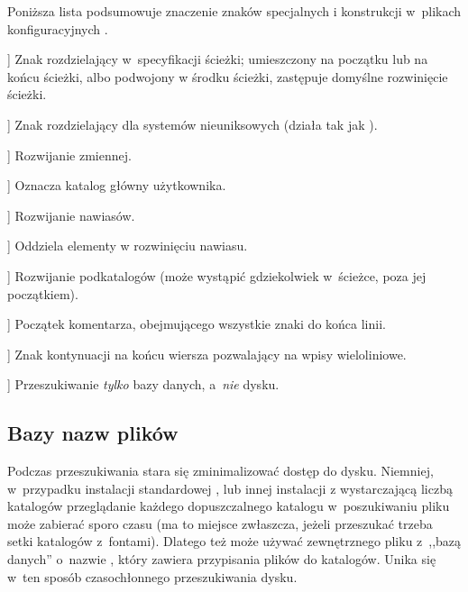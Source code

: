 \documentclass{article}
\begin{document}
Poniższa lista podsumowuje znaczenie znaków specjalnych i konstrukcji w~plikach
konfiguracyjnych \KPS{}.

\newcommand{\CODE}[1]{\makebox[3em][l]{\code{#1}}}
\begin{ttdescription}
\item[\CODE{:}] Znak rozdzielający w~specyfikacji ścieżki; umieszczony na
 początku lub na końcu ścieżki, albo podwojony w środku ścieżki, zastępuje domyślne rozwinięcie ścieżki.\par
\item[\CODE{;}] Znak rozdzielający dla systemów nieuniksowych
 (działa tak jak \code{:}).
\item[\CODE{\$}] Rozwijanie zmiennej.
\item[\CODE{\string~}] Oznacza katalog główny użytkownika.
\item[\CODE{\char`\{\dots\char`\}}] Rozwijanie nawiasów.%
\item[\CODE{,}] Oddziela elementy w rozwinięciu nawiasu.%
\item[\CODE{//}] Rozwijanie podkatalogów (może wystąpić gdziekolwiek
 w~ścieżce, poza jej początkiem).
\item[\CODE{\%}] Początek komentarza, obejmującego wszystkie znaki do końca
 linii.
\item[\CODE{\bs}] Znak kontynuacji na końcu wiersza pozwalający na wpisy wieloliniowe.%
\item[\CODE{!!}] Przeszukiwanie \emph{tylko} bazy danych,
         a~\emph{nie} dysku.
\end{ttdescription}

\subsection{Bazy nazw plików}
\label{sec:filename-database}

Podczas przeszukiwania \KPS{} stara się  zminimalizować dostęp do dysku.
Niemniej, w~przypadku instalacji standardowej \TL, lub innej instalacji z wystarczającą liczbą katalogów
przeglądanie każdego dopuszczalnego katalogu w~poszukiwaniu pliku może
zabierać sporo czasu (ma to miejsce zwłaszcza, jeżeli przeszukać trzeba setki
katalogów z~fontami).
Dlatego też \KPS{} może używać zewnętrznego pliku z~,,bazą danych''
o~nazwie , który zawiera przypisania plików do katalogów.
Unika się  w~ten sposób czasochłonnego przeszukiwania dysku.
\end{document}
